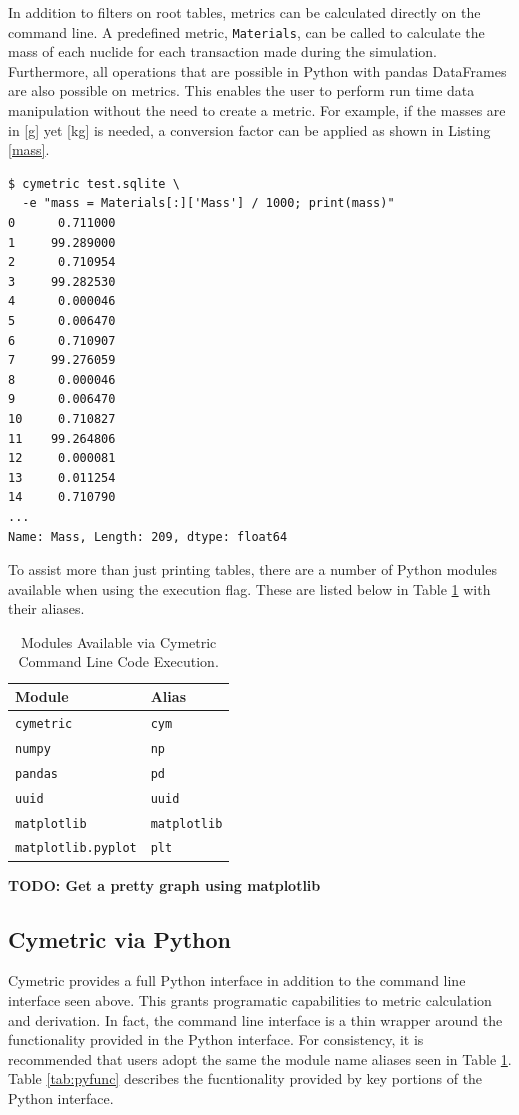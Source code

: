 \documentclass{anstrans}
\newcommand{\TODO}[1] {{\color{red}\textbf{TODO: #1}}}
\newcommand{\code}[1]{{\color{code}\texttt{#1}}}
\begin{document}
In addition to filters on root tables, metrics can  be calculated directly 
on the command line. A predefined metric, \code{Materials}, can be called 
to calculate the mass of each nuclide for each transaction made during 
the simulation. Furthermore, all operations that are possible in Python 
with pandas DataFrames are also possible on metrics.  This enables the user
to perform run time data manipulation without the need to create a metric.
For example, if the masses are in [g] yet [kg] is needed, 
a conversion factor can be applied as shown in Listing \ref{mass}.

\begin{lstlisting}[caption ={Calculating and Manipulating Metrics}, label=mass]
$ cymetric test.sqlite \
  -e "mass = Materials[:]['Mass'] / 1000; print(mass)"
0      0.711000
1     99.289000
2      0.710954
3     99.282530
4      0.000046
5      0.006470
6      0.710907
7     99.276059
8      0.000046
9      0.006470
10     0.710827
11    99.264806
12     0.000081
13     0.011254
14     0.710790
...
Name: Mass, Length: 209, dtype: float64
\end{lstlisting}

To assist more than just printing tables, there are a number of Python 
modules available when using the execution flag. These are listed below 
in Table \ref{tab:modules} with their aliases.

\begin{table}[htb]
\centering
\caption{Modules Available via Cymetric Command Line Code Execution.}
\begin{tabular}{ll}
\toprule
  Module                   & Alias \\
\midrule
  \code{cymetric}          & \code {cym} \\
  \code{numpy}             & \code{np} \\  
  \code{pandas}            & \code{pd} \\
  \code{uuid}              & \code{uuid} \\
  \code{matplotlib}        & \code{matplotlib} \\
  \code{matplotlib.pyplot} & \code{plt} \\
\bottomrule
\end{tabular}
  \label{tab:modules}
\end{table}

\TODO{Get a pretty graph using matplotlib}

\subsection{Cymetric via Python}
Cymetric provides a full Python interface in addition to the command line 
interface seen above. This grants programatic capabilities to metric 
calculation and derivation. In fact, the command line interface is a thin
wrapper around the functionality provided in the Python interface.
For consistency, it is recommended that users adopt the same the module name 
aliases seen in Table \ref{tab:modules}. 
Table \ref{tab:pyfunc} describes the fucntionality provided by key 
portions of the Python interface.
\end{document}
